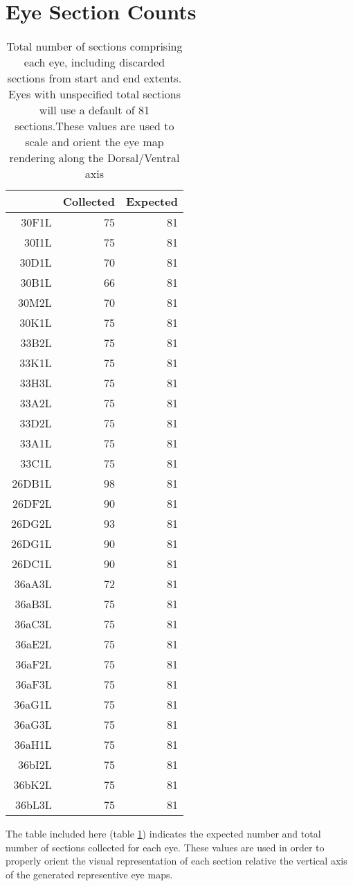 \documentclass{article}
\begin{document}
\section{Eye Section Counts}

\begin{table}[ht]
\centering
\begin{tabular}{rrr}
  \hline
 & Collected & Expected \\ 
  \hline
30F1L &  75 &  81 \\ 
  30I1L &  75 &  81 \\ 
  30D1L &  70 &  81 \\ 
  30B1L &  66 &  81 \\ 
  30M2L &  70 &  81 \\ 
  30K1L &  75 &  81 \\ 
  33B2L &  75 &  81 \\ 
  33K1L &  75 &  81 \\ 
  33H3L &  75 &  81 \\ 
  33A2L &  75 &  81 \\ 
  33D2L &  75 &  81 \\ 
  33A1L &  75 &  81 \\ 
  33C1L &  75 &  81 \\ 
  26DB1L &  98 &  81 \\ 
  26DF2L  &  90 &  81 \\ 
  26DG2L &  93 &  81 \\ 
  26DG1L &  90 &  81 \\ 
  26DC1L &  90 &  81 \\ 
  36aA3L &  72 &  81 \\ 
  36aB3L &  75 &  81 \\ 
  36aC3L &  75 &  81 \\ 
  36aE2L &  75 &  81 \\ 
  36aF2L &  75 &  81 \\ 
  36aF3L &  75 &  81 \\ 
  36aG1L &  75 &  81 \\ 
  36aG3L &  75 &  81 \\ 
  36aH1L &  75 &  81 \\ 
  36bI2L &  75 &  81 \\ 
  36bK2L &  75 &  81 \\ 
  36bL3L &  75 &  81 \\ 
   \hline
\end{tabular}
\caption{Total number of sections comprising each eye, including discarded sections from start and end extents. Eyes with unspecified total sections will use a default of 81 sections.These values are used to scale and orient the eye map rendering along the Dorsal/Ventral axis} 
\label{tab:sectioncounttable}
\end{table}The table included here (table \ref{tab:sectioncounttable}) indicates the expected number and total number of sections collected for each eye. These values are used in order to properly orient the visual representation of each section relative the vertical axis of the generated representive eye maps.
\clearpage
\end{document}
